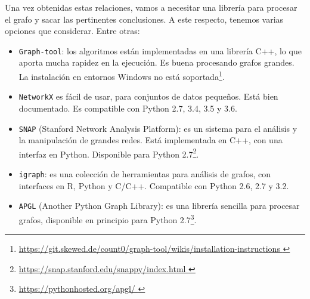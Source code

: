 Una vez obtenidas estas relaciones, vamos a necesitar una librería 
para procesar el grafo y sacar las pertinentes 
conclusiones. A este respecto, tenemos varias opciones que 
considerar. Entre otras:
\begin{itemize}
\item {\tt Graph-tool}: los algoritmos están implementadas en una librería C++, 
lo que aporta mucha rapidez en la ejecución. Es 
buena procesando grafos grandes. La instalación en entornos Windows no
está soportada\footnote{\url{https://git.skewed.de/count0/graph-tool/wikis/installation-instructions 
}}.
\item {\tt NetworkX} es fácil de usar, para conjuntos de datos pequeños. Está bien
documentado. Es compatible con Python 2.7, 3.4, 3.5 y 3.6.
\item {\tt SNAP} (Stanford Network Analysis Platform): es un sistema para el análisis
y la manipulación de grandes redes. Está implementada en C++, con una interfaz en Python. 
Disponible para Python 2.7\footnote{\url{https://snap.stanford.edu/snappy/index.html }}.
\item {\tt igraph}: es una colección de herramientas para análisis de grafos,
con interfaces en R, Python y C/C++. Compatible con Python 2.6, 2.7 y 3.2.
\item {\tt APGL} (Another Python Graph Library): es una librería sencilla
para procesar grafos, disponible en principio para Python 2.7\footnote{\url{https://pythonhosted.org/apgl/ }}.
\end{itemize}


